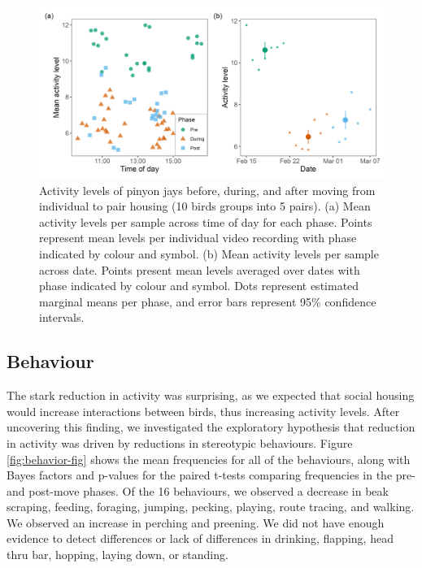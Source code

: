 \documentclass[
  pub]{apa6}
\begin{document}
\begin{figure}

{\centering \includegraphics[width=0.8\linewidth]{figures/activity_time_date} 

}

\caption{Activity levels of pinyon jays before, during, and after moving from individual to pair housing (10 birds groups into 5 pairs). (a) Mean activity levels per sample across time of day for each phase. Points represent mean levels per individual video recording with phase indicated by colour and symbol. (b) Mean activity levels per sample across date. Points present mean levels averaged over dates with phase indicated by colour and symbol. Dots represent estimated marginal means per phase, and error bars represent 95\% confidence intervals.}\label{fig:activity-fig}
\end{figure}

\subsection{Behaviour}\label{behaviour}

The stark reduction in activity was surprising, as we expected that social housing would increase interactions between birds, thus increasing activity levels. After uncovering this finding, we investigated the exploratory hypothesis that reduction in activity was driven by reductions in stereotypic behaviours. Figure \ref{fig:behavior-fig} shows the mean frequencies for all of the behaviours, along with Bayes factors and p-values for the paired t-tests comparing frequencies in the pre- and post-move phases. Of the 16 behaviours, we observed a decrease in beak scraping, feeding, foraging, jumping, pecking, playing, route tracing, and walking. We observed an increase in perching and preening. We did not have enough evidence to detect differences or lack of differences in drinking, flapping, head thru bar, hopping, laying down, or standing.
\end{document}
